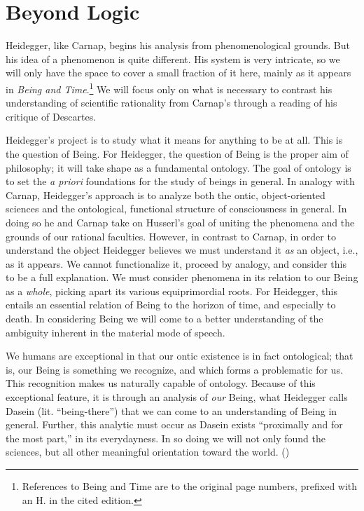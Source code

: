\documentclass[leqno, 12pt]{turabian-researchpaper}
\begin{document}
	\section{Beyond Logic}

	Heidegger, like Carnap, begins his analysis from phenomenological grounds. But
	his idea of a phenomenon is quite different. His system is very intricate, so
	we will only have the space to cover a small fraction of it here, mainly as it
	appears in \textit{Being and Time}.\footnote{References to Being and Time are
	to the original page numbers, prefixed with an H. in the cited edition.} We
	will focus only on what is necessary to contrast his understanding of
	scientific rationality from Carnap's through a reading of his critique of
	Descartes.

	Heidegger's project is to study what it means for anything to be at all. This is
	the question of Being. For Heidegger, the question of Being is the proper aim of
	philosophy; it will take shape as a fundamental ontology. The goal of ontology
	is to set the \textit{a priori} foundations for the study of beings in general.
	In analogy with Carnap, Heidegger's approach is to analyze both the ontic, object-oriented
	sciences and the ontological, functional structure of consciousness in general.
	In doing so he and Carnap take on Husserl's goal of uniting the phenomena and the
	grounds of our rational faculties. However, in contrast to Carnap, in order to
	understand the object Heidegger believes we must understand it \emph{as} an object,
	i.e., as it appears. We cannot functionalize it, proceed by analogy, and consider
	this to be a full explanation. We must consider phenomena in its relation to
	our Being as a \emph{whole}, picking apart its various equiprimordial roots. For
	Heidegger, this entails an essential relation of Being to the horizon of time,
	and especially to death. In considering Being we will come to a better
	understanding of the ambiguity inherent in the material mode of speech.

	We humans are exceptional in that our ontic existence is in fact ontological; that
	is, our Being is something we recognize, and which forms a problematic for us.
	This recognition makes us naturally capable of ontology. Because of this exceptional
	feature, it is through an analysis of \emph{our} Being, what Heidegger calls
	Dasein (lit. \enquote{being-there}) that we can come to an understanding of
	Being in general. Further, this analytic must occur as Dasein exists \enquote{proximally and for the most part,}
	in its everydayness. In so doing we will not only found the sciences, but all other
	meaningful orientation toward the world. ()
\end{document}

